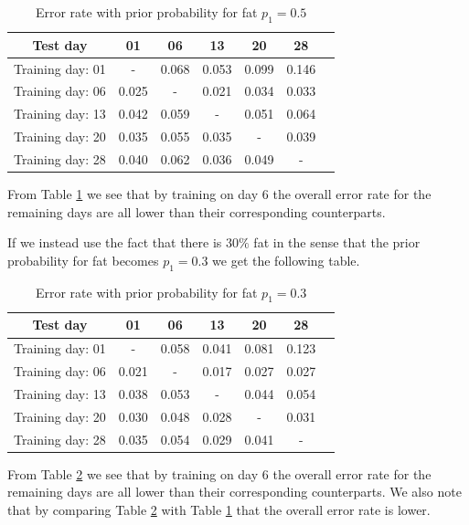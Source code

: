 \documentclass{article}
\begin{document}
\begin{table}[H]
    \centering
    \begin{tabular}{|c|c|c|c|c|c|c}
        \hline
        Test day & 01 & 06 & 13 & 20 & 28 \\
        \hline
        Training day: 01 & - & 0.068 & 0.053 & 0.099 & 0.146 \\
        Training day: 06 & 0.025 & - & 0.021 & 0.034 & 0.033 \\
        Training day: 13 & 0.042 & 0.059 & - & 0.051 & 0.064 \\
        Training day: 20 & 0.035 & 0.055 & 0.035 & - & 0.039 \\
        Training day: 28 & 0.040 & 0.062 & 0.036 & 0.049 & - \\
        \hline
    \end{tabular}
    \caption{Error rate with prior probability for fat $p_1 = 0.5$}
    \label{tab:multivariate-simple-prior}
\end{table}

From Table \ref{tab:multivariate-simple-prior} we see that by training on day 6 the overall error rate for the remaining days are all lower than their corresponding counterparts. 

If we instead use the fact that there is $30\%$ fat in the sense that the prior probability for fat becomes $p_1 = 0.3$ we get the following table.

\begin{table}[H]
    \centering
    \begin{tabular}{|c|c|c|c|c|c|c}
    \hline
    Test day & 01 & 06 & 13 & 20 & 28 \\
    \hline
    Training day: 01 & - & 0.058 & 0.041 & 0.081 & 0.123 \\
    Training day: 06 & 0.021 & - & 0.017 & 0.027 & 0.027 \\
    Training day: 13 & 0.038 & 0.053 & - & 0.044 & 0.054 \\
    Training day: 20 & 0.030 & 0.048 & 0.028 & - & 0.031 \\
    Training day: 28 & 0.035 & 0.054 & 0.029 & 0.041 & - \\
    \hline
    \end{tabular}
    \caption{Error rate with prior probability for fat $p_1 = 0.3$}
    \label{tab:multivariate-correct-prior}
\end{table}

From Table \ref{tab:multivariate-correct-prior} we see that by training on day 6 the overall error rate for the remaining days are all lower than their corresponding counterparts. 
We also note that by comparing Table \ref{tab:multivariate-correct-prior} with Table \ref{tab:multivariate-simple-prior} that the overall error rate is lower. 
\end{document}
